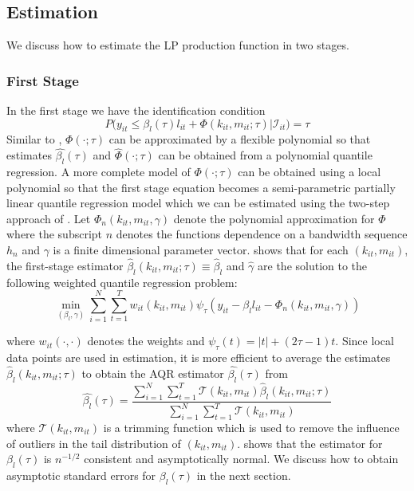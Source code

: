 \documentclass[11pt]{article}
\begin{document}
\subsection{Estimation}
We discuss how to estimate the LP production function in two stages. 
\subsubsection*{First Stage}
In the first stage we have the identification condition
\begin{equation} 
	P\big(y_{it}\leq \beta_{l}(\tau)l_{it}+\Phi(k_{it}, m_{it}; \tau)\big|\mathcal{I}_{it})=\tau
\end{equation}
Similar to \cite{Olley1996}, $\Phi(\cdot;\tau)$ can be approximated by a flexible polynomial so that estimates $\hat{\beta_{l}}(\tau)$ and $\hat{\Phi}(\cdot;\tau)$ can be obtained from a polynomial quantile regression. A more complete model of $\Phi(\cdot;\tau)$ can be obtained using a local polynomial so that the first stage equation becomes a semi-parametric partially linear quantile regression model which we can be estimated using the two-step approach of \cite{Lee2003}. Let $\Phi_{n}(k_{it}, m_{it}, \gamma)$ denote the polynomial approximation for $\Phi$ where the subscript $n$ denotes the functions dependence on a bandwidth sequence $h_{n}$ and $\gamma$ is a finite dimensional parameter vector. \cite{Lee2003} shows that for each $(k_{it}, m_{it})$, the first-stage estimator $\hat{\beta}_{l}(k_{it}, m_{it}; \tau)\equiv \hat{\beta}_{l}$ and $\hat{\gamma}$ are the solution to the following weighted quantile regression problem:
\begin{equation}
\underset{(\beta_{l}, \gamma)}{\operatorname{min}}\sum_{i=1}^{N}\sum_{t=1}^{T}w_{it}(k_{it}, m_{it})\psi_{\tau}(y_{it}-\beta_{l}l_{it}-\Phi_{n}(k_{it}, m_{it}, \gamma))
\end{equation}

where $w_{it}(\cdot, \cdot)$ denotes the weights and $\psi_{\tau}(t)=|t|+(2\tau-1)t$. Since local data points are used in estimation, it is more efficient to average the estimates $\hat{\beta}_{l}(k_{it}, m_{it}; \tau)$ to obtain the AQR estimator $\hat{\beta_{l}}(\tau)$ from
\begin{equation}
\hat{\beta_{l}}(\tau)=\frac{\sum_{i=1}^{N}\sum_{t=1}^{T}\mathcal{T}(k_{it}, m_{it})\hat{\beta}_{l}(k_{it}, m_{it}; \tau)}{\sum_{i=1}^{N}\sum_{t=1}^{T}\mathcal{T}(k_{it}, m_{it})}
\end{equation}
where $\mathcal{T}(k_{it}, m_{it})$ is a trimming function which is used to remove the influence of outliers in the tail distribution of $(k_{it}, m_{it})$. \cite{Lee2003} shows that the estimator for $\beta_{l}(\tau)$ is $n^{-1/2}$ consistent and asymptotically normal. We discuss how to obtain asymptotic standard errors for $\beta_{l}(\tau)$ in the next section.
\end{document}
